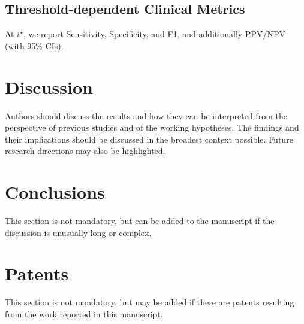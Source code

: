 \documentclass[journal,article,submit,pdftex,moreauthors]{Definitions/mdpi}
\begin{document}
\subsection{Threshold-dependent Clinical Metrics}
At $t^\star$, we report Sensitivity, Specificity, and F1, and additionally PPV/NPV (with 95\% CIs).


\section{Discussion}

Authors should discuss the results and how they can be interpreted from the perspective of previous studies and of the working hypotheses. The findings and their implications should be discussed in the broadest context possible. Future research directions may also be highlighted.

\section{Conclusions}

This section is not mandatory, but can be added to the manuscript if the discussion is unusually long or complex.

\section{Patents}

This section is not mandatory, but may be added if there are patents resulting from the work reported in this manuscript.

\vspace{6pt} 


\end{document}
